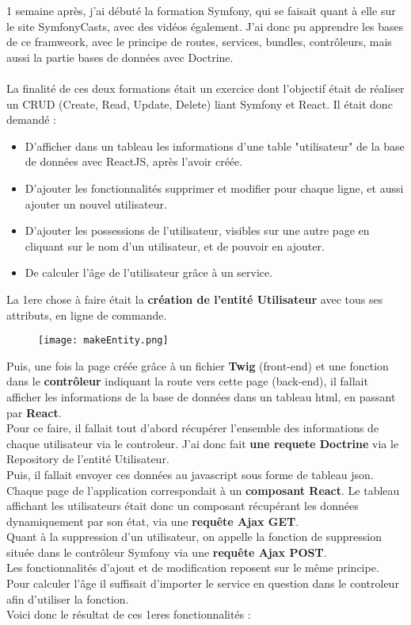 1 semaine après, j'ai débuté la formation Symfony, qui se faisait quant à elle sur le site SymfonyCasts, avec des vidéos également.
J'ai donc pu apprendre les bases de ce framweork, avec le principe de routes, services, bundles, contrôleurs, mais aussi la partie bases de données avec Doctrine.\\\\

La finalité de ces deux formations était un exercice dont l'objectif était de réaliser un CRUD (Create, Read, Update, Delete) liant Symfony et React.
Il était donc demandé :\\
\begin{itemize}
    \item D'afficher dans un tableau les informations d'une table "utilisateur" de la base de données avec ReactJS, après l'avoir créée.
    \item D'ajouter les fonctionnalités supprimer et modifier pour chaque ligne, et aussi ajouter un nouvel utilisateur.
    \item D'ajouter les possessions de l'utilisateur, visibles sur une autre page en cliquant sur le nom d'un utilisateur, et de pouvoir en ajouter.
    \item De calculer l'âge de l'utilisateur grâce à un service.
\end{itemize}

La 1ere chose à faire était la \textbf{création de l'entité Utilisateur} avec tous ses attributs, en ligne de commande.
\begin{figure}[H]
    \texttt{[image: makeEntity.png]}
\end{figure}


Puis, une fois la page créée grâce à un fichier \textbf{Twig} (front-end) et une fonction dans le \textbf{contrôleur} indiquant la route vers cette page (back-end), il fallait afficher les informations de la base de données dans un tableau html, en passant par \textbf{React}.\\
Pour ce faire, il fallait tout d'abord récupérer l'ensemble des informations de chaque utilisateur via le controleur. J'ai donc fait \textbf{une requete Doctrine} via le Repository de l'entité Utilisateur.
\\Puis, il fallait envoyer ces données au javascript sous forme de tableau json. Chaque page de l'application correspondait à un \textbf{composant React}. 
Le tableau affichant les utilisateurs était donc un composant récupérant les données dynamiquement par son état, via une \textbf{requête Ajax GET}.\\
Quant à la suppression d'un utilisateur, on appelle la fonction de suppression située dans le contrôleur Symfony via une \textbf{requête Ajax POST}.\\
Les fonctionnalités d'ajout et de modification reposent sur le même principe.\\
Pour calculer l'âge il suffisait d'importer le service en question dans le controleur afin d'utiliser la fonction.\\
Voici donc le résultat de ces 1eres fonctionnalités :

